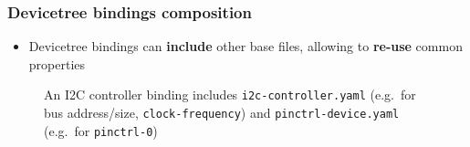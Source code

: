 \documentclass[handout]{beamer}
\begin{document}
\begin{frame}
  \frametitle{Devicetree bindings composition}

  \begin{itemize}
    \item Devicetree bindings can \textbf{include} other base files, allowing to
          \textbf{re-use} common properties
  \end{itemize}

  \begin{figure}
    \centering
    \caption{An I2C controller binding includes \texttt{i2c-controller.yaml}
      (e.g.\ for bus address/size, \texttt{clock-frequency}) and
      \texttt{pinctrl-device.yaml} (e.g.\ for \texttt{pinctrl-0})}
  \end{figure}
\end{frame}
\end{document}
